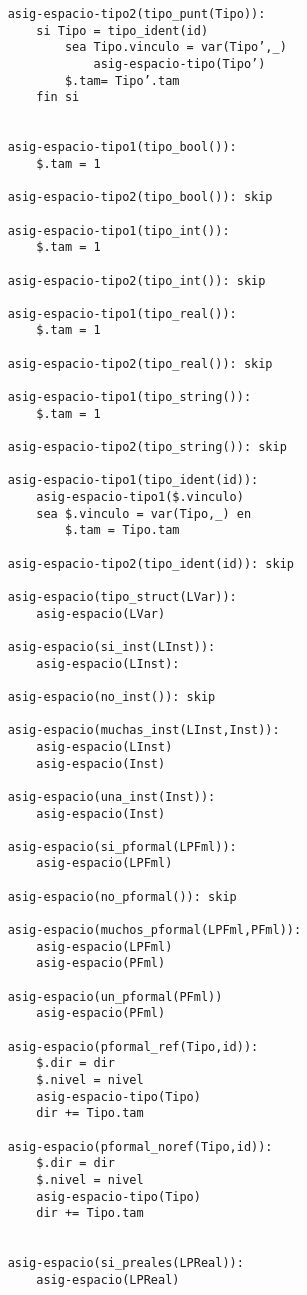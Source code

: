 \begin{lstlisting}
    asig-espacio-tipo2(tipo_punt(Tipo)):
        si Tipo = tipo_ident(id)
            sea Tipo.vinculo = var(Tipo’,_)
                asig-espacio-tipo(Tipo’) 
            $.tam= Tipo’.tam
        fin si 
 

    asig-espacio-tipo1(tipo_bool()): 
        $.tam = 1

    asig-espacio-tipo2(tipo_bool()): skip

    asig-espacio-tipo1(tipo_int()): 
        $.tam = 1

    asig-espacio-tipo2(tipo_int()): skip

    asig-espacio-tipo1(tipo_real()): 
        $.tam = 1

    asig-espacio-tipo2(tipo_real()): skip

    asig-espacio-tipo1(tipo_string()): 
        $.tam = 1

    asig-espacio-tipo2(tipo_string()): skip

    asig-espacio-tipo1(tipo_ident(id)):
        asig-espacio-tipo1($.vinculo)
        sea $.vinculo = var(Tipo,_) en
            $.tam = Tipo.tam

    asig-espacio-tipo2(tipo_ident(id)): skip

    asig-espacio(tipo_struct(LVar)):
        asig-espacio(LVar)

    asig-espacio(si_inst(LInst)):
        asig-espacio(LInst):

    asig-espacio(no_inst()): skip

    asig-espacio(muchas_inst(LInst,Inst)):
        asig-espacio(LInst)
        asig-espacio(Inst)

    asig-espacio(una_inst(Inst)):
        asig-espacio(Inst)

    asig-espacio(si_pformal(LPFml)):
        asig-espacio(LPFml)

    asig-espacio(no_pformal()): skip

    asig-espacio(muchos_pformal(LPFml,PFml)):
        asig-espacio(LPFml)
        asig-espacio(PFml)

    asig-espacio(un_pformal(PFml))
        asig-espacio(PFml)

    asig-espacio(pformal_ref(Tipo,id)):
        $.dir = dir
        $.nivel = nivel
        asig-espacio-tipo(Tipo)
        dir += Tipo.tam

    asig-espacio(pformal_noref(Tipo,id)):
        $.dir = dir
        $.nivel = nivel
        asig-espacio-tipo(Tipo)
        dir += Tipo.tam
        

    asig-espacio(si_preales(LPReal)):
        asig-espacio(LPReal)


\end{lstlisting}
